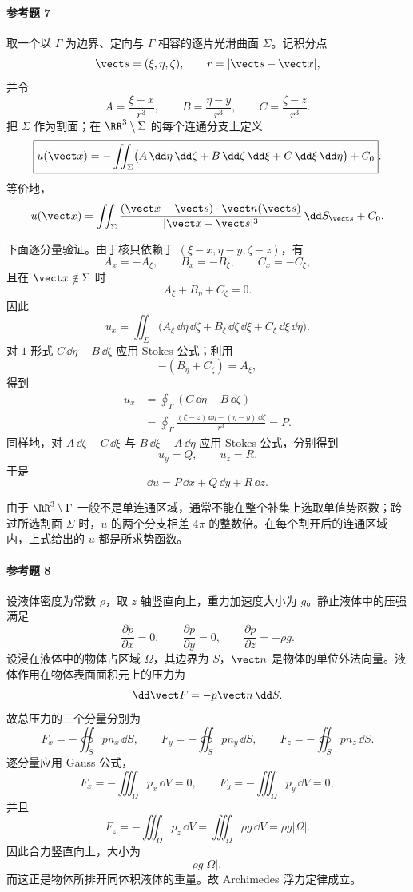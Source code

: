 \paragraph{参考题 7}
\begin{xsolution}
取一个以 $\Gamma$ 为边界、定向与 $\Gamma$ 相容的逐片光滑曲面 $\Sigma$。记积分点
\[
  \vect s=(\xi,\eta,\zeta),\qquad
  r=|\vect s-\vect x|,
\]
并令
\[
  A=\frac{\xi-x}{r^3},\qquad
  B=\frac{\eta-y}{r^3},\qquad
  C=\frac{\zeta-z}{r^3}.
\]
把 $\Sigma$ 作为割面；在 $\RR^3\setminus\Sigma$ 的每个连通分支上定义
\[
\boxed{
  u(\vect x)
  =-\iint_\Sigma
  \bigl(A\,\dd\eta\,\dd\zeta
  +B\,\dd\zeta\,\dd\xi
  +C\,\dd\xi\,\dd\eta\bigr)+C_0}.
\]
等价地，
\[
  u(\vect x)=
  \iint_\Sigma
  \frac{(\vect x-\vect s)\cdot\vect n(\vect s)}{|\vect x-\vect s|^3}\,\dd S_{\vect s}+C_0.
\]

下面逐分量验证。由于核只依赖于 $(\xi-x,\eta-y,\zeta-z)$，有
\[
  A_x=-A_\xi,\qquad B_x=-B_\xi,\qquad C_x=-C_\xi,
\]
且在 $\vect x\notin\Sigma$ 时
\[
  A_\xi+B_\eta+C_\zeta=0.
\]
因此
\[
  u_x=\iint_\Sigma
  \bigl(A_\xi\,\dd\eta\,\dd\zeta
  +B_\xi\,\dd\zeta\,\dd\xi
  +C_\xi\,\dd\xi\,\dd\eta\bigr).
\]
对 $1$-形式 $C\,\dd\eta-B\,\dd\zeta$ 应用 Stokes 公式；利用
\[
  -(B_\eta+C_\zeta)=A_\xi,
\]
得到
\begin{align*}
u_x
&=\oint_\Gamma(C\,\dd\eta-B\,\dd\zeta)\\
&=\oint_\Gamma
\frac{(\zeta-z)\,\dd\eta-(\eta-y)\,\dd\zeta}{r^3}=P.
\end{align*}
同样地，对 $A\,\dd\zeta-C\,\dd\xi$ 与 $B\,\dd\xi-A\,\dd\eta$ 应用 Stokes 公式，分别得到
\[
  u_y=Q,
  \qquad
  u_z=R.
\]
于是
\[
  \boxed{\dd u=P\,\dd x+Q\,\dd y+R\,\dd z}.
\]

由于 $\RR^3\setminus\Gamma$ 一般不是单连通区域，通常不能在整个补集上选取单值势函数；跨过所选割面 $\Sigma$ 时，$u$ 的两个分支相差 $4\pi$ 的整数倍。在每个割开后的连通区域内，上式给出的 $u$ 都是所求势函数。
\end{xsolution}

\paragraph{参考题 8}
\begin{xsolution}
设液体密度为常数 $\rho$，取 $z$ 轴竖直向上，重力加速度大小为 $g$。静止液体中的压强满足
\[
  \frac{\partial p}{\partial x}=0,
  \qquad
  \frac{\partial p}{\partial y}=0,
  \qquad
  \frac{\partial p}{\partial z}=-\rho g.
\]
设浸在液体中的物体占区域 $\Omega$，其边界为 $S$，$\vect n$ 是物体的单位外法向量。液体作用在物体表面面积元上的压力为
\[
  \dd\vect F=-p\vect n\,\dd S.
\]
故总压力的三个分量分别为
\[
  F_x=-\oiint_Sp n_x\,\dd S,
  \qquad
  F_y=-\oiint_Sp n_y\,\dd S,
  \qquad
  F_z=-\oiint_Sp n_z\,\dd S.
\]
逐分量应用 Gauss 公式，
\[
  F_x=-\iiint_\Omega p_x\,\dd V=0,
  \qquad
  F_y=-\iiint_\Omega p_y\,\dd V=0,
\]
并且
\[
  F_z=-\iiint_\Omega p_z\,\dd V
  =\iiint_\Omega\rho g\,\dd V
  =\rho g|\Omega|.
\]
因此合力竖直向上，大小为
\[
  \rho g|\Omega|,
\]
而这正是物体所排开同体积液体的重量。故 Archimedes 浮力定律成立。
\end{xsolution}
